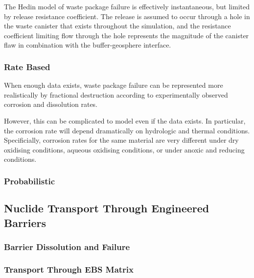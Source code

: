 The Hedin model of waste package failure is effectively instantaneous, 
but limited by release resistance coefficient. The release is assumed  
to occur through a hole in the waste canister that exists throughout 
the simulation, and the resistance coefficient limiting flow through 
the hole represents the magnitude of the canister flaw in combination
with the buffer-geosphere interface.  \cite{hedin_integrated_2002}

\subsubsection{Rate Based}
When enough data exists, waste package failure can be represented more  
realistically by fractional destruction according to experimentally 
observed corrosion and dissolution rates. 

However, this can be complicated to model even if the data exists. In  
particular, the corrosion rate will depend 
dramatically on hydrologic and thermal 
conditions. Specificially, corrosion rates for the same material are 
very different under dry oxidising conditions,
aqueous oxidising conditions,
or under anoxic and reducing conditions.

\subsubsection{Probabilistic}


\subsection{Nuclide Transport Through Engineered Barriers}

\subsubsection{Barrier Dissolution and Failure}

\subsubsection{Transport Through EBS Matrix}


